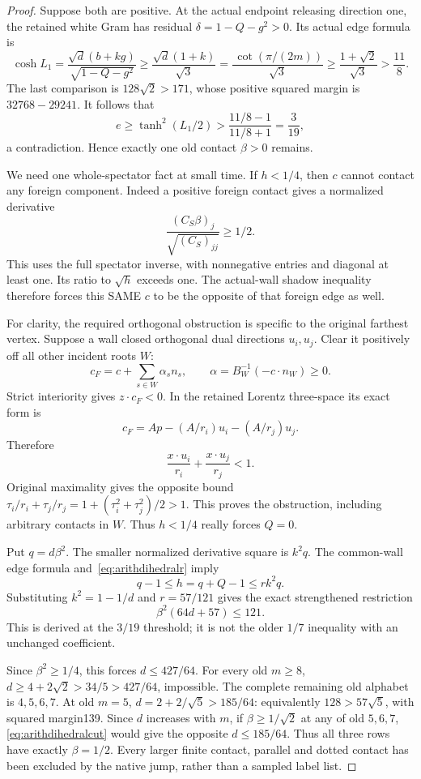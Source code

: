 \documentclass[11pt]{article}
\begin{document}
\begin{proof}
Suppose both are positive.
At the actual endpoint releasing direction one, the retained
white Gram has residual \(\delta=1-Q-g^2>0\).
Its actual edge formula is
\[
 \cosh L_1={\frac{\sqrt d(b+kg)}{\sqrt{1-Q-g^2}}}
 \ge{\frac{\sqrt d(1+k)}{\sqrt3}}
 ={\frac{\,\cot(\pi/(2m))}{\sqrt3}}
 \ge{\frac{1+\sqrt2}{\sqrt3}}>{\frac{11}{8}}.
\]
The last comparison is \(128\sqrt2>171\), whose positive
squared margin is \(32768-29241\).
It follows that
\[
 e\ge\tanh^2(L_1/2)>
 {\frac{11/8-1}{11/8+1}}={\frac{3}{19}},
\]
a contradiction.  Hence exactly one old contact \(\beta>0\)
remains.

We need one whole-spectator fact at small time.
If \(h<1/4\), then \(c\) cannot contact any foreign component.
Indeed a positive foreign contact gives a normalized derivative
\[
 {\frac{(C_S\beta)_j}{\sqrt{(C_S)_{jj}}}}\ge1/2 .
\]
This uses the full spectator inverse, with nonnegative entries
and diagonal at least one.
Its ratio to \(\sqrt h\) exceeds one.
The actual-wall shadow inequality therefore forces this SAME
\(c\) to be the opposite of that foreign edge as well.

For clarity, the required orthogonal obstruction is specific to
the original farthest vertex.  Suppose a wall closed orthogonal
dual directions \(u_i,u_j\).
Clear it positively off all other incident roots \(W\):
\[
 c_F=c+\sum_{s\in W}\alpha_sn_s,\qquad
 \alpha=B_W^{-1}(-c\cdot n_W)\ge0.
\]
Strict interiority gives \(z\cdot c_F<0\).
In the retained Lorentz three-space its exact form is
\[
 c_F=A p-(A/r_i)u_i-(A/r_j)u_j .
\]
Therefore
\[
 {\frac{x\cdot u_i}{r_i}}+{\frac{x\cdot u_j}{r_j}}<1.
\]
Original maximality gives the opposite bound
\(\tau_i/r_i+\tau_j/r_j
 =1+(\tau_i^2+\tau_j^2)/2>1\).
This proves the obstruction, including arbitrary contacts in \(W\).
Thus \(h<1/4\) really forces \(Q=0\).

Put \(q=d\beta^2\).
The smaller normalized derivative square is \(k^2q\).
The common-wall edge formula and~\eqref{eq:arithdihedralr} imply
\[
 q-1\le h=q+Q-1\le rk^2q .
\]
Substituting \(k^2=1-1/d\) and \(r=57/121\) gives the exact
strengthened restriction
\[
                         \beta^2(64d+57)\le121 .
\tag{Dih2}\label{eq:arithdihedralcut}
\]
This is derived at the \(3/19\) threshold; it is not the older
\(1/7\) inequality with an unchanged coefficient.

Since \(\beta^2\ge1/4\), this forces \(d\le427/64\).
For every old \(m\ge8\),
\(d\ge4+2\sqrt2>34/5>427/64\), impossible.
The complete remaining old alphabet is \(4,5,6,7\).
At old \(m=5\),
\(d=2+2/\sqrt5>185/64\):
equivalently \(128>57\sqrt5\), with squared margin139.
Since \(d\) increases with \(m\), if
\(\beta\ge1/\sqrt2\) at any of old \(5,6,7\),
\eqref{eq:arithdihedralcut} would give the opposite
\(d\le185/64\).
Thus all three rows have exactly \(\beta=1/2\).
Every larger finite contact, parallel and dotted contact has
been excluded by the native jump, rather than a sampled label list.


\end{proof}
\end{document}

